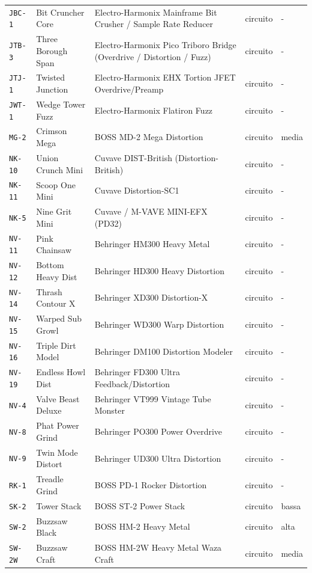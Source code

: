 \begin{xltabular}{\linewidth}{@{}l l X l l@{}}
\texttt{JBC-1} & Bit Cruncher Core & Electro-Harmonix Mainframe Bit Crusher / Sample Rate Reducer & circuito & -\\
\texttt{JTB-3} & Three Borough Span & Electro-Harmonix Pico Triboro Bridge (Overdrive / Distortion / Fuzz) & circuito & -\\
\texttt{JTJ-1} & Twisted Junction & Electro-Harmonix EHX Tortion JFET Overdrive/Preamp & circuito & -\\
\texttt{JWT-1} & Wedge Tower Fuzz & Electro-Harmonix Flatiron Fuzz & circuito & -\\
\texttt{MG-2} & Crimson Mega & BOSS MD-2 Mega Distortion & circuito & media\\
\texttt{NK-10} & Union Crunch Mini & Cuvave DIST-British (Distortion-British) & circuito & -\\
\texttt{NK-11} & Scoop One Mini & Cuvave Distortion-SC1 & circuito & -\\
\texttt{NK-5} & Nine Grit Mini & Cuvave / M-VAVE MINI-EFX (PD32) & circuito & -\\
\texttt{NV-11} & Pink Chainsaw & Behringer HM300 Heavy Metal & circuito & -\\
\texttt{NV-12} & Bottom Heavy Dist & Behringer HD300 Heavy Distortion & circuito & -\\
\texttt{NV-14} & Thrash Contour X & Behringer XD300 Distortion-X & circuito & -\\
\texttt{NV-15} & Warped Sub Growl & Behringer WD300 Warp Distortion & circuito & -\\
\texttt{NV-16} & Triple Dirt Model & Behringer DM100 Distortion Modeler & circuito & -\\
\texttt{NV-19} & Endless Howl Dist & Behringer FD300 Ultra Feedback/Distortion & circuito & -\\
\texttt{NV-4} & Valve Beast Deluxe & Behringer VT999 Vintage Tube Monster & circuito & -\\
\texttt{NV-8} & Phat Power Grind & Behringer PO300 Power Overdrive & circuito & -\\
\texttt{NV-9} & Twin Mode Distort & Behringer UD300 Ultra Distortion & circuito & -\\
\texttt{RK-1} & Treadle Grind & BOSS PD-1 Rocker Distortion & circuito & -\\
\texttt{SK-2} & Tower Stack & BOSS ST-2 Power Stack & circuito & bassa\\
\texttt{SW-2} & Buzzsaw Black & BOSS HM-2 Heavy Metal & circuito & alta\\
\texttt{SW-2W} & Buzzsaw Craft & BOSS HM-2W Heavy Metal Waza Craft & circuito & media\\

\end{xltabular}
